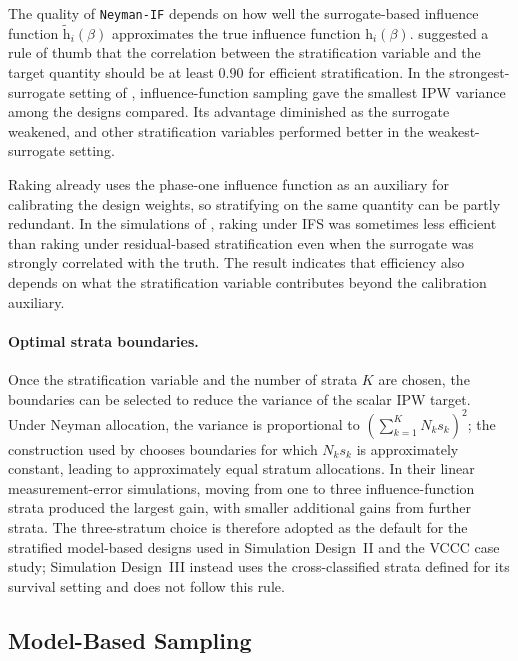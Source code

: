 The quality of \texttt{Neyman-IF} depends on how well the surrogate-based influence function $\tilde{\mathrm{h}}_i(\beta)$ approximates the true influence function $\mathrm{h}_i(\beta)$. \citet{sarndal1992model} suggested a rule of thumb that the correlation between the stratification variable and the target quantity should be at least $0.90$ for efficient stratification. In the strongest-surrogate setting of \citet{amorim2021two}, influence-function sampling gave the smallest IPW variance among the designs compared. Its advantage diminished as the surrogate weakened, and other stratification variables performed better in the weakest-surrogate setting.

Raking already uses the phase-one influence function as an auxiliary for calibrating the design weights, so stratifying on the same quantity can be partly redundant. In the simulations of \citet{amorim2021two}, raking under IFS was sometimes less efficient than raking under residual-based stratification even when the surrogate was strongly correlated with the truth. The result indicates that efficiency also depends on what the stratification variable contributes beyond the calibration auxiliary.

\paragraph{Optimal strata boundaries.}
Once the stratification variable and the number of strata $K$ are chosen, the boundaries can be selected to reduce the variance of the scalar IPW target. Under Neyman allocation, the variance is proportional to $\left(\sum_{k=1}^{K} N_k s_k\right)^2$; the construction used by \citet{amorim2021two} chooses boundaries for which $N_k s_k$ is approximately constant, leading to approximately equal stratum allocations. In their linear measurement-error simulations, moving from one to three influence-function strata produced the largest gain, with smaller additional gains from further strata. The three-stratum choice is therefore adopted as the default for the stratified model-based designs used in Simulation Design~II and the VCCC case study; Simulation Design~III instead uses the cross-classified strata defined for its survival setting and does not follow this rule.

\subsection{Model-Based Sampling}
\label{sec:model_sampling}

